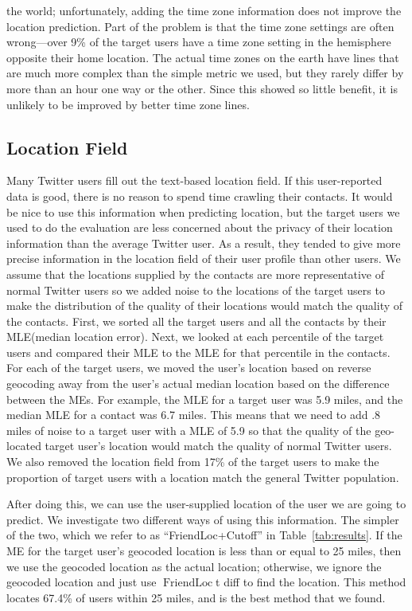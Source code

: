 \documentclass[letterpaper]{article}
\DeclareMathOperator{\FriendLoc}{FriendLoc}
\begin{document}
the world; unfortunately, adding the time zone information does not improve the
location prediction.
%
Part of the problem is that the time zone settings are often wrong---over 9\% of
the target users have a time zone setting in the hemisphere opposite their home
location.
%
The actual time zones on the earth have lines that are much more complex than
the simple metric we used, but they rarely differ by more than an hour one way
or the other.
%
Since this showed so little benefit, it is unlikely to be improved by better
time zone lines.

\fi

\subsection{Location Field}
Many Twitter users fill out the text-based location field.
%
If this user-reported data is good, there is no reason to spend time
crawling their contacts.
%
It would be nice to use this information when predicting location, but
the target users we used to do the evaluation are less concerned about
the privacy of their location information than the average Twitter user.
%
As a result, they tended to give more precise information in the location
field of their user profile than other users.
%
We assume that the locations supplied by the contacts are more
representative of normal Twitter users so we added noise to the locations
of the target users to make the distribution of the quality of their
locations would match the quality of the contacts.
%
First, we sorted all the target users and all the contacts by their
MLE(median location error).
%
Next, we looked at each percentile of the target users and compared
their MLE to the MLE for that percentile in the contacts.
%
For each of the target users, we moved the user's location based on
reverse geocoding away from the user's actual median location based on the
difference between the MEs.
%
For example, the MLE for a target user was 5.9 miles, and the median
MLE for a contact was 6.7 miles.
%
This means that we need to add .8 miles of noise to a target user
with a MLE of 5.9 so that the quality of the geo-located target user's location
would match the quality of normal Twitter users.
%
We also removed the location field from 17\% of the target users to
make the proportion of target users with a location match the general
Twitter population.

After doing this, we can use the user-supplied location of the user we are
going to predict.
%
We investigate two different ways of using this information.
%
The simpler of the two, which we refer to as ``FriendLoc+Cutoff'' in
Table~\ref{tab:results}.
%
If the ME for the target user's geocoded location is less than or equal to 25
miles, then we use the geocoded location as the actual location; otherwise, we
ignore the geocoded location and just use $\FriendLoc$t diff to find the location.
%
This method locates 67.4\% of users within 25 miles, and is the best method
that we found.
\end{document}
